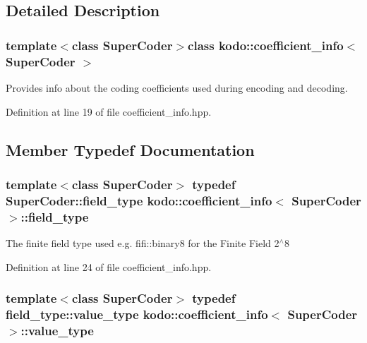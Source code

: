 \subsection{Detailed Description}
\subsubsection*{template$<$class Super\-Coder$>$class kodo\-::coefficient\-\_\-info$<$ Super\-Coder $>$}

Provides info about the coding coefficients used during encoding and decoding. 

Definition at line 19 of file coefficient\-\_\-info.\-hpp.



\subsection{Member Typedef Documentation}
\hypertarget{classkodo_1_1coefficient__info_a99c7ca3d45844ae0ea385e26ab89e7e2}{
\subsubsection[{field\-\_\-type}]{\setlength{\rightskip}{0pt plus 5cm}template$<$class Super\-Coder$>$ typedef Super\-Coder\-::field\-\_\-type {\bf kodo\-::coefficient\-\_\-info}$<$ Super\-Coder $>$\-::{\bf field\-\_\-type}}}\label{classkodo_1_1coefficient__info_a99c7ca3d45844ae0ea385e26ab89e7e2}




The finite field type used e.\-g. fifi\-::binary8 for the Finite Field 2$^\wedge$8 

Definition at line 24 of file coefficient\-\_\-info.\-hpp.

\hypertarget{classkodo_1_1coefficient__info_aad4c09d64c58a0469b87aff5ee7c1607}{
\subsubsection[{value\-\_\-type}]{\setlength{\rightskip}{0pt plus 5cm}template$<$class Super\-Coder$>$ typedef field\-\_\-type\-::value\-\_\-type {\bf kodo\-::coefficient\-\_\-info}$<$ Super\-Coder $>$\-::{\bf value\-\_\-type}}}\label{classkodo_1_1coefficient__info_aad4c09d64c58a0469b87aff5ee7c1607}




